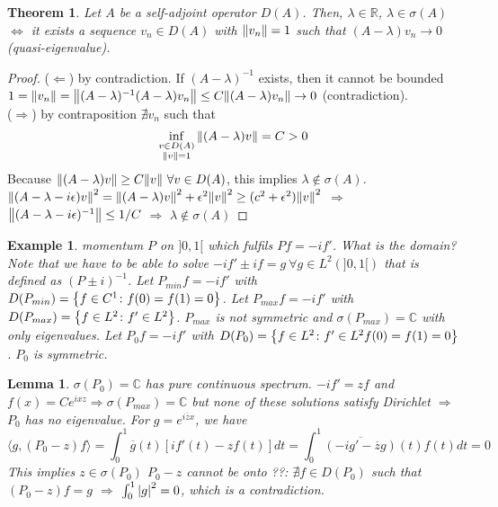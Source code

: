 \documentclass{article}
\newtheorem*{theorem}{Theorem}
\newtheorem*{lemma}{Lemma}
\newtheorem*{example}{Example}
\newcommand{\RR}{\mathbb{R}}
\newcommand{\CC}{\mathbb{C}}
\newcommand{\eps}{\epsilon}
\newcommand{\sig}{\sigma}
\newcommand{\la}{\lambda}
\renewcommand{\sp}[2]{\langle #1,#2 \rangle}
\begin{document}
\begin{theorem}
  Let $A$ be a self-adjoint operator $D(A)$. 
  Then, $\la \in \RR$, $\la \in \sig(A)$ $\Leftrightarrow$ it exists a sequence $v_n \in D(A)$ with $\norm{v_n} = 1$ such that $(A - \la) v_n \to 0$ (quasi-eigenvalue).
\end{theorem}

\begin{proof} 
  ($\Leftarrow$) by contradiction. If $(A - \la)^{-1}$ exists, then it cannot be bounded 
  $1 = \norm{v_n} = \norm{(A - \la)^{-1} (A - \la) v_n} \le C \norm{(A - \la) v_n} \to 0$ (contradiction).
  \\
  ($\Rightarrow$) by contraposition
  $\nexists v_n$ such that 
  $$\inf_{\substack{v\in D(A) \\ \norm{v} = 1}} \norm{(A - \la)v} = C > 0$$
  Because $\norm{(A - \la) v} \ge C \norm{v} \ \forall v \in D(A)$, this implies $\la \notin \sig(A)$.
  $\norm{(A - \la - i \eps)v}^2 = \norm{(A - \la)v}^2 + \eps^2 \norm{v}^2 \ge (c^2 +\eps^2) \norm{v}^2$ 
  $\Rightarrow$ $\norm{(A - \la - i \eps)^{-1}} \le 1/C$ 
  $\Rightarrow$ $\la \notin \sig(A)$
\end{proof} 

\begin{example} 
  momentum $P$ on $]0,1[$ which fulfils $P f = - i f'$.
  What is the domain? 
  Note that we have to be able to solve $-i f' \pm i f = g \ \forall g \in L^2(]0,1[)$ that is defined as $(P \pm i)^{-1}$.
  Let $P_{min} f = - i f'$ with $D(P_{min}) = \qty{ f \in C^1 \colon f(0) = f(1) = 0 }$.
  Let $P_{max} f = - i f'$ with $D(P_{max}) = \qty{ f \in L^2 \colon f' \in L^2 }$.
  $P_{max}$ is not symmetric and $\sig(P_{max}) = \CC$ with only eigenvalues.
  Let $P_0 f = - i f'$ with  $D(P_0) = \qty{ f \in L^2 \colon f' \in L^2 f(0) = f(1) = 0 }$.
  $P_0$ is symmetric.
\end{example} 

\begin{lemma} 
  $\sig(P_0) = \CC$ has pure continuous spectrum.
  $- i f' = z f$ and $f(x) = C e^{ixz} \Rightarrow \sig(P_{max}) = \CC$ 
  but none of these solutions satisfy Dirichlet $\Rightarrow$ $P_0$ has no eigenvalue.
  For $g = e^{i\overline{z}x}$, we have 
  $$ \sp{g}{(P_0 - z)f} = \int_0^1 \overline{g}(t) [i f'(t) - z f(t)] dt = \int_0^1 \overline{(-i g'-\overline{z} g)}(t) f(t) dt = 0$$
  This implies $z \in \sig(P_0)$ 
  $P_0 - z$ cannot be onto ??: $\nexists f \in D(P_0)$ such that $(P_0 - z) f = g$ $\Rightarrow$ $\int_0^1 \abs{g}^2 = 0$, which is a contradiction.
\end{lemma}
\end{document}
